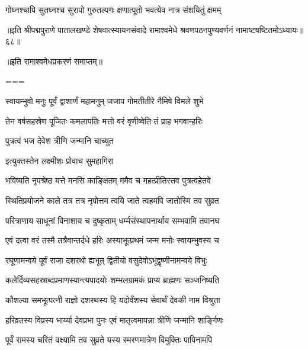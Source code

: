 \twolineshloka
{गोघ्नश्चापि सुतघ्नश्च सुरापो गुरुतल्पगः}
{क्षणात्पूतो भवत्येव नात्र संशयितुं क्षमम्}%

{॥इति श्रीपद्मपुराणे पातालखण्डे शेषवात्स्यायनसंवादे रामाश्वमेधे श्रवणपठनपुण्यवर्णनं नामाष्टषष्टितमोऽध्यायः॥६८॥}

{॥इति रामाश्वमेधप्रकरणं समाप्तम्॥}

===



\twolineshloka
{स्वायम्भुवो मनुः पूर्वं द्वाशार्णं महामनुम्}
{जजाप गोमतीतीरे नैमिषे विमले शुभे}%

\twolineshloka
{तेन वर्षसहस्रेण पूजितः कमलापतिः}
{मत्तो वरं वृणीष्वेति तं प्राह भगवान्हरिः}%


\onelineshloka
{पुत्रत्वं भज देवेश त्रीणि जन्मानि चाच्युत}%


\onelineshloka
{इत्युक्तस्तेन लक्ष्मीशः प्रोवाच सुमहागिरा}%


\twolineshloka
{भविष्यति नृपश्रेष्ठ यत्ते मनसि काङ्क्षितम्}
{ममैव च महत्प्रीतिस्तव पुत्रत्वहेतवे}%

\twolineshloka
{स्थितिप्रयोजने काले तत्र तत्र नृपोत्तम}
{त्वयि जाते त्वहमपि जातोस्मि तव सुव्रत}%

\twolineshloka
{परित्राणाय साधूनां विनाशाय च दुष्कृताम्}
{धर्म्मसंस्थापनार्थाय सम्भवामि तवानघ}%


\twolineshloka
{एवं दत्वा वरं तस्मै तत्रैवान्तर्दधे हरिः}
{अस्याभूत्प्रथमं जन्म मनोः स्वायम्भुवस्य च}%

\twolineshloka
{रघूणामन्वये पूर्वं राजा दशरथो ह्यभूत्}
{द्वितीयो वसुदेवोऽभूद्वृष्णीनामन्वये विभुः}%

\twolineshloka
{कलेर्दिव्यसहस्राब्दप्रमाणस्यान्त्यपादयोः}
{शम्भलग्रामकं प्राप्य ब्राह्मणः सञ्जनिष्यति}%

\twolineshloka
{कौशल्या समभूत्पत्नी राज्ञो दशरथस्य हि}
{यदोर्वंशस्य सेवार्थं देवकी नाम विश्रुता}%

\twolineshloka
{हरिव्रतस्य विप्रस्य भार्य्या देवप्रभा पुनः}
{एवं मातृत्वमापन्ना त्रीणि जन्मानि शार्ङ्गिणः}%

\twolineshloka
{पूर्वं रामस्य चरितं वक्ष्यामि तव सुव्रते}
{यस्य स्मरणमात्रेण विमुक्तिः पापिनामपि}%

